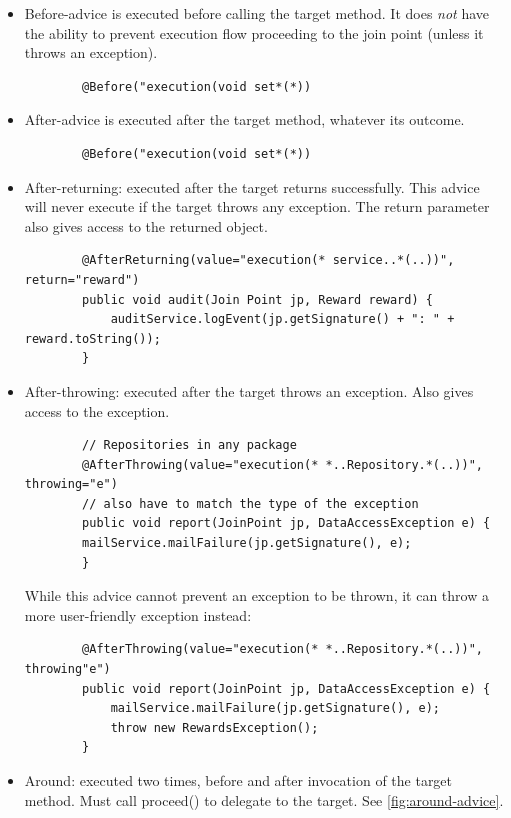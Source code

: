 \documentclass{scrartcl}
\begin{document}
\begin{itemize}
    \item Before-advice is executed before calling the target method. It does \textit{not} have the ability to prevent execution flow proceeding to the join point (unless it throws an exception).

    \begin{lstlisting}
        @Before("execution(void set*(*))    \end{lstlisting}
    \item
    After-advice is executed after the target method, whatever its outcome.
    \begin{lstlisting}
        @Before("execution(void set*(*))
    \end{lstlisting}
    \item
    After-returning: executed after the target returns successfully. This advice will never execute if the target throws any exception.
    The return parameter also gives access to the returned object.
    \begin{lstlisting}
        @AfterReturning(value="execution(* service..*(..))", return="reward")
        public void audit(Join Point jp, Reward reward) {
            auditService.logEvent(jp.getSignature() + ": " + reward.toString());
        }
    \end{lstlisting}
    \item
    After-throwing: executed after the target throws an exception.
    Also gives access to the exception.
    \begin{lstlisting}
        // Repositories in any package
        @AfterThrowing(value="execution(* *..Repository.*(..))", throwing="e")
        // also have to match the type of the exception
        public void report(JoinPoint jp, DataAccessException e) {
        mailService.mailFailure(jp.getSignature(), e);
        }
    \end{lstlisting}
    While this advice cannot prevent an exception to be thrown, it can throw a more user-friendly exception instead:
    \begin{lstlisting}
        @AfterThrowing(value="execution(* *..Repository.*(..))", throwing"e")
        public void report(JoinPoint jp, DataAccessException e) {
            mailService.mailFailure(jp.getSignature(), e);
            throw new RewardsException();
        }
    \end{lstlisting}
    \item
    Around: executed two times, before and after invocation of the target method. Must call proceed() to delegate to the target. See \ref{fig:around-advice}.

\end{itemize}
\end{document}

